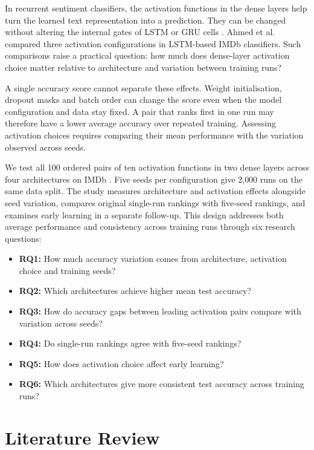 \documentclass[conference,a4paper]{IEEEtran}
\begin{document}
In recurrent sentiment classifiers, the activation functions
in the dense layers help turn the learned text representation
into a prediction. They can be changed without altering the
internal gates of LSTM or GRU cells
\cite{hochreiter1997,cho2014}. Ahmed et al.~\cite{ahmed2025}
compared three activation configurations in LSTM-based IMDb
classifiers. Such comparisons raise a practical question:
how much does dense-layer activation choice matter relative
to architecture and variation between training runs?

A single accuracy score cannot separate these effects.
Weight initialisation, dropout masks and batch order can
change the score even when the model configuration and data
stay fixed. A pair that ranks first in one run may therefore
have a lower average accuracy over repeated training.
Assessing activation choices requires comparing their mean
performance with the variation observed across seeds.

We test all 100 ordered pairs of ten activation functions in
two dense layers across four architectures on IMDb
\cite{maas2011}. Five seeds per configuration give
2{,}000 runs on the same data split. The study measures
architecture and activation effects alongside seed variation,
compares original single-run rankings with five-seed rankings,
and examines early learning in a separate follow-up. This
design addresses both average performance and consistency
across training runs through six research questions:

\begin{itemize}\itemsep0pt
  \item \textbf{RQ1:} How much accuracy variation comes from
        architecture, activation choice and training seeds?
  \item \textbf{RQ2:} Which architectures achieve higher mean
        test accuracy?
  \item \textbf{RQ3:} How do accuracy gaps between leading
        activation pairs compare with variation across seeds?
  \item \textbf{RQ4:} Do single-run rankings agree with
        five-seed rankings?
  \item \textbf{RQ5:} How does activation choice affect early
        learning?
  \item \textbf{RQ6:} Which architectures give more consistent
        test accuracy across training runs?
\end{itemize}

\FloatBarrier
\section{Literature Review}
\end{document}

